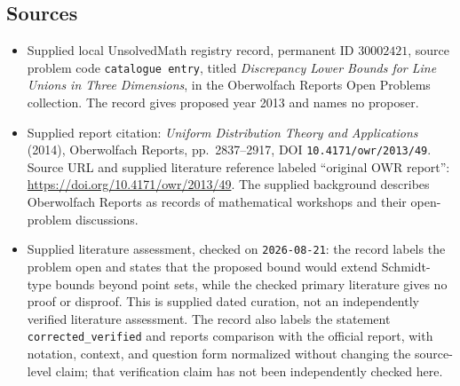 \documentclass[11pt]{article}
\begin{document}
\subsection{Sources}
\begin{itemize}
\item Supplied local UnsolvedMath registry record, permanent ID \(30002421\), source problem code \texttt{catalogue entry}, titled \emph{Discrepancy Lower Bounds for Line Unions in Three Dimensions}, in the Oberwolfach Reports Open Problems collection. The record gives proposed year 2013 and names no proposer.
\item Supplied report citation: \emph{Uniform Distribution Theory and Applications} (2014), Oberwolfach Reports, pp.\ 2837--2917, DOI \texttt{10.4171/owr/2013/49}. Source URL and supplied literature reference labeled ``original OWR report'': \url{https://doi.org/10.4171/owr/2013/49}. The supplied background describes Oberwolfach Reports as records of mathematical workshops and their open-problem discussions.
\item Supplied literature assessment, checked on \texttt{2026-08-21}: the record labels the problem open and states that the proposed bound would extend Schmidt-type bounds beyond point sets, while the checked primary literature gives no proof or disproof. This is supplied dated curation, not an independently verified literature assessment. The record also labels the statement \texttt{corrected\_verified} and reports comparison with the official report, with notation, context, and question form normalized without changing the source-level claim; that verification claim has not been independently checked here.
\end{itemize}
\end{document}
